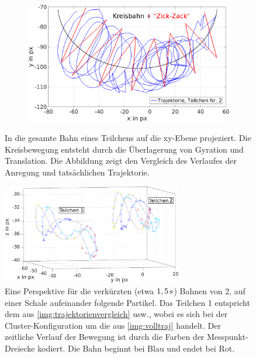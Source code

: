 \begin{figure}[!h]
\begin{subfigure}{0.49\textwidth}
              \includegraphics[width=\textwidth,height=0.8\textwidth]{figs/auswertung/gyratkurzerauszug.png}
              \caption{}\label{img:trajektorienvergleich}
            \end{subfigure}
            \caption{In  die gesamte Bahn eines Teilchens auf die xy-Ebene projeziert. Die Kreisbewegung entsteht durch die Überlagerung von Gyration und Translation. Die Abbildung  zeigt den Vergleich des Verlaufes der Anregung und tatsächlichen Trajektorie.}
          \end{figure}

\newpage

            \begin{figure}[!h]
              \centering
              \includegraphics[width=0.7\textwidth]{figs/auswertung/gyratcoloredeins.png}
              \caption{Eine Perspektive für die verkürzten (etwa $\unit[1,5]{s}$) Bahnen von 2, auf einer Schale aufeinander folgende Partikel. Das Teilchen 1 entspricht dem aus \autoref{img:trajektorienvergleich} usw., wobei es sich bei der Cluster-Konfiguration um die aus \autoref{img:volltraj} handelt. Der zeitliche Verlauf der Bewegung ist durch die Farben der Messpunkt-Dreiecke kodiert. Die Bahn beginnt bei Blau und endet bei Rot.}\label{img:perspekt1}
            \end{figure}

